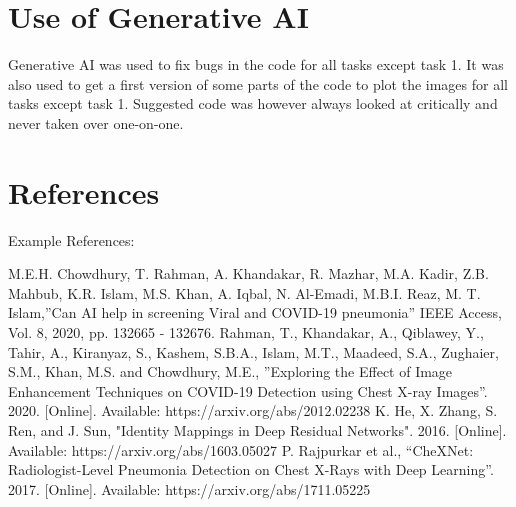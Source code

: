 \documentclass[conference]{IEEEtran}
\begin{document}
\section{Use of Generative AI}\label{sec:generative_AI}
Generative AI was used to fix bugs in the code for all tasks except task 1. It was also used to get a first version of some parts of the code to plot the images for all tasks except task 1. Suggested code was however always looked at critically and never taken over one-on-one.


\section*{References}
Example References:
\begin{thebibliography}{00}
 M.E.H. Chowdhury, T. Rahman, A. Khandakar, R. Mazhar, M.A. Kadir, Z.B. Mahbub, K.R. Islam, M.S. Khan, A. Iqbal, N. Al-Emadi, M.B.I. Reaz, M. T. Islam,''Can AI help in screening Viral and COVID-19 pneumonia'' IEEE Access, Vol. 8, 2020, pp. 132665 - 132676.
 Rahman, T., Khandakar, A., Qiblawey, Y., Tahir, A., Kiranyaz, S., Kashem, S.B.A., Islam, M.T., Maadeed, S.A., Zughaier, S.M., Khan, M.S. and Chowdhury, M.E., ''Exploring the Effect of Image Enhancement Techniques on COVID-19 Detection using Chest X-ray Images''. 2020. [Online]. Available: https://arxiv.org/abs/2012.02238
 K. He, X. Zhang, S. Ren, and J. Sun, "Identity Mappings in Deep Residual Networks". 2016. [Online]. Available: https://arxiv.org/abs/1603.05027
 P. Rajpurkar et al., ``CheXNet: Radiologist-Level Pneumonia Detection on Chest X-Rays with Deep Learning''. 2017. [Online]. Available: https://arxiv.org/abs/1711.05225

\end{thebibliography}
\end{document}
